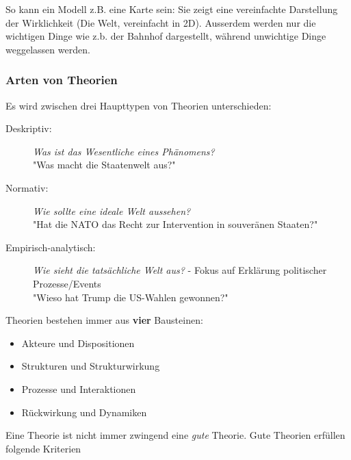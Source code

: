 \documentclass[a4paper, 11pt]{article}
\begin{document}
So kann ein Modell z.B. eine Karte sein: Sie zeigt eine vereinfachte Darstellung der Wirklichkeit (Die Welt, vereinfacht in 2D). Ausserdem werden nur die wichtigen Dinge wie z.b. der Bahnhof dargestellt, während unwichtige Dinge weggelassen werden. 

\subsubsection{Arten von Theorien}
Es wird zwischen drei Haupttypen von Theorien unterschieden: 

\begin{description}
	\item[Deskriptiv: ] \textit{Was ist das Wesentliche eines Phänomens?} \\
	"Was macht die Staatenwelt aus?"
	\item[Normativ: ] \textit{Wie sollte eine ideale Welt aussehen?} \\
	"Hat die NATO das Recht zur Intervention in souveränen Staaten?"
	\item[Empirisch-analytisch: ] \textit{Wie sieht die tatsächliche Welt aus?} - Fokus auf Erklärung politischer Prozesse/Events \\
	"Wieso hat Trump die US-Wahlen gewonnen?"
\end{description}

\vspace{10px}

Theorien bestehen immer aus \textbf{vier} Bausteinen: 

\begin{itemize}
	\item Akteure und Dispositionen
	\item Strukturen und Strukturwirkung
	\item Prozesse und Interaktionen
	\item Rückwirkung und Dynamiken
\end{itemize}


\vspace{10px}

\noindent Eine Theorie ist nicht immer zwingend eine \textit{gute} Theorie. Gute Theorien erfüllen folgende Kriterien
\end{document}
